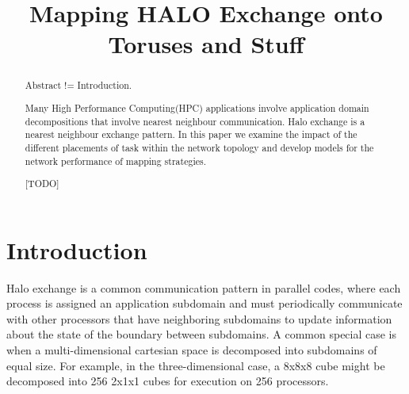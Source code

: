\documentclass[conference,10pt]{IEEEtran}
\begin{document}
\setlength{\pdfpageheight}{\paperheight}
\setlength{\pdfpagewidth}{\paperwidth}


\title{Mapping HALO Exchange onto Toruses and Stuff}

\author{
}

\maketitle


\begin{abstract}
Abstract != Introduction.

Many High Performance Computing(HPC) applications involve application domain decompositions that
involve nearest neighbour communication. Halo exchange is a nearest neighbour exchange pattern.
In this paper we examine the impact of the different placements of task within the network topology
and develop models for the network performance of mapping strategies.


[TODO]
\end{abstract}

\section{Introduction}

Halo exchange is a common communication pattern in parallel codes, where
each process is assigned an application subdomain and must periodically
communicate with other processors that have neighboring subdomains to
update information about the state of the boundary between subdomains.
A common special case is when a multi-dimensional cartesian space is
decomposed into subdomains of equal size.  For example, in the three-dimensional
case, a 8x8x8 cube might be decomposed into 256 2x1x1 cubes for execution on 256 processors.
\end{document}

